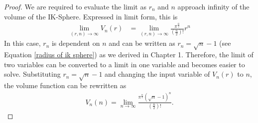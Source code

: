 \begin{proof}
    We are required to evaluate the limit as $r_n$ and $n$ approach infinity of the volume of the IK-Sphere. Expressed in limit form, this is
    \begin{align*}
        \lim_{(r,n)\to\infty}V_n(r)&=\lim_{(r,n)\to\infty}\frac{\pi^{\frac{n}{2}}}{\left(\frac{n}{2}\right)!}r^n
    \end{align*}
    In this case, $r_n$ is dependent on $n$ and can be written as $r_n=\sqrt{n}-1$ (see Equation \ref{radius of ik sphere}) as we derived in Chapter 1. Therefore, the limit of two variables can be converted to a limit in one variable and becomes easier to solve. Substituting $r_n=\sqrt{n}-1$ and changing the input variable of $V_n(r)$ to $n$, the volume function can be rewritten as
    \begin{align*}
        V_n(n) = \lim_{n\to\infty}\frac{\pi^{\frac{n}{2}}{\left(\sqrt{n}-1\right)}^n}{\left(\frac{n}{2}\right)!}.
    \end{align*}
    

\end{proof}
